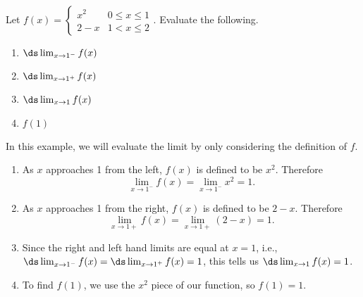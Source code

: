 \begin{example}\label{ex_onesided}%
Let $f(x) = \begin{cases} x^2 & 0\leq x\leq 1 \\ 2-x & 1<x\leq 2\end{cases}.$ Evaluate the following.
\begin{multicols}{2}
	\begin{enumerate}
		\item	$\ds \lim_{x\to 1^-} f(x)$
		\item	$\ds \lim_{x\to 1^+} f(x)$
		\item	$\ds \lim_{x\to 1} f(x)$
		\item	$f(1)$
	\end{enumerate}
\end{multicols}
\solution
In this example, we will evaluate the limit by only considering the definition of $f$.
\begin{enumerate}
	\item	As $x$ approaches 1 from the left, $f(x)$ is defined to be $x^2$. Therefore \[\lim_{x\to1^-} f(x)=\lim_{x\to1^-} x^2=1.\]
	\item	As $x$ approaches 1 from the right, $f(x)$ is defined to be $2-x$. Therefore \[\lim_{x\to 1+} f(x)=\lim_{x\to 1+}(2-x)=1.\]
	\item	Since the right and left hand limits are equal at $x=1$, i.e., $\ds \lim_{x\to1^-} f(x)=\ds \lim_{x\to1^+} f(x)=1$, this tells us $\ds \lim_{x\to1} f(x)=1$.
	\item	To find $f(1)$, we use the $x^2$ piece of our function, so $f(1)=1$.
\end{enumerate}
\end{example}

